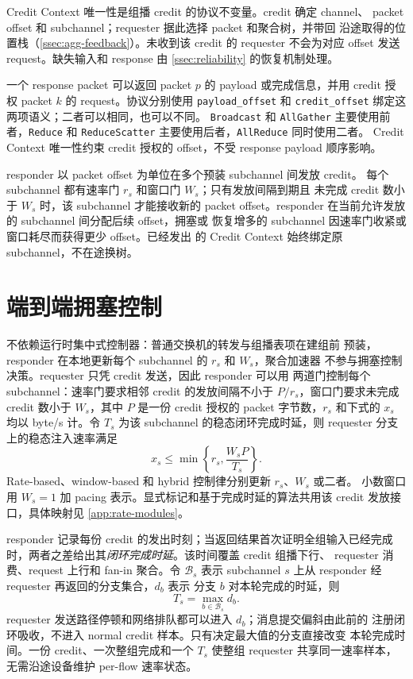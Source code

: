 Credit Context 唯一性是组播 credit 的协议不变量。credit 确定 channel、
packet offset 和 subchannel；requester 据此选择 packet 和聚合树，并带回
沿途取得的位置栈（\cref{ssec:agg-feedback}）。未收到该 credit 的
requester 不会为对应 offset 发送 request。缺失输入和 response 由
\cref{ssec:reliability} 的恢复机制处理。

一个 response packet 可以返回 packet $p$ 的 payload 或完成信息，并用
credit 授权 packet $k$ 的 request。协议分别使用 \texttt{payload\_offset}
和 \texttt{credit\_offset} 绑定这两项语义；二者可以相同，也可以不同。
\texttt{Broadcast} 和 \texttt{AllGather} 主要使用前者，\texttt{Reduce}
和 \texttt{ReduceScatter} 主要使用后者，\texttt{AllReduce} 同时使用二者。
Credit Context 唯一性约束 credit 授权的 offset，不受 response payload
顺序影响。

responder 以 packet offset 为单位在多个预装 subchannel 间发放 credit。
每个 subchannel 都有速率门 $r_s$ 和窗口门 $W_s$；只有发放间隔到期且
未完成 credit 数小于 $W_s$ 时，该 subchannel 才能接收新的 packet
offset。responder 在当前允许发放的 subchannel 间分配后续 offset，拥塞或
恢复增多的 subchannel 因速率门收紧或窗口耗尽而获得更少 offset。已经发出
的 Credit Context 始终绑定原 subchannel，不在途换树。

\section{端到端拥塞控制}
\label{ssec:cc}

\sysname 不依赖运行时集中式控制器：普通交换机的转发与组播表项在建组前
预装，responder 在本地更新每个 subchannel 的 $r_s$ 和 $W_s$，聚合加速器
不参与拥塞控制决策。requester 只凭 credit 发送，因此 responder 可以用
两道门控制每个 subchannel：速率门要求相邻 credit 的发放间隔不小于
$P/r_s$，窗口门要求未完成 credit 数小于 $W_s$，其中 $P$ 是一份 credit
授权的 packet 字节数，$r_s$ 和下式的 $x_s$ 均以 byte/s 计。令 $T_s$ 为该
subchannel 的稳态闭环完成时延，则 requester 分支上的稳态注入速率满足
\begin{equation}
    x_s \le \min\left\{r_s,\frac{W_sP}{T_s}\right\}.
    \label{eq:cc-two-gates}
\end{equation}
Rate-based、window-based 和 hybrid 控制律分别更新 $r_s$、$W_s$ 或二者。
小数窗口用 $W_s=1$ 加 pacing 表示。显式标记和基于完成时延的算法共用该
credit 发放接口，具体映射见 \cref{app:rate-modules}。

responder 记录每份 credit 的发出时刻；当返回结果首次证明全组输入已经完成
时，两者之差给出其\emph{闭环完成时延}。该时间覆盖 credit 组播下行、
requester 消费、request 上行和 fan-in 聚合。令 $\mathcal{B}_s$ 表示
subchannel $s$ 上从 responder 经 requester 再返回的分支集合，$d_b$ 表示
分支 $b$ 对本轮完成的时延，则
\begin{equation}
    T_s=\max_{b\in\mathcal{B}_s} d_b.
    \label{eq:completion-delay}
\end{equation}
requester 发送路径停顿和网络排队都可以进入 $d_b$；消息提交偏斜由此前的
注册闭环吸收，不进入 normal credit 样本。只有决定最大值的分支直接改变
本轮完成时间。一份 credit、一次整组完成和一个 $T_s$ 使整组 requester
共享同一速率样本，无需沿途设备维护 per-flow 速率状态。

